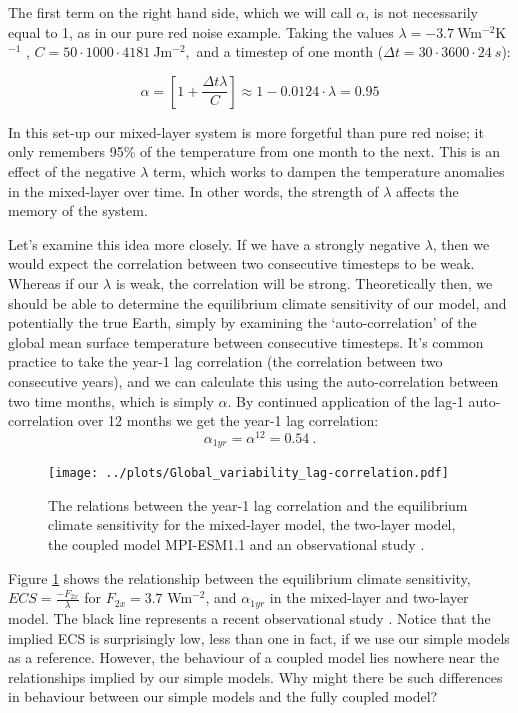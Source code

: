\documentclass[12pt]{book}
\begin{document}
The first term on the right hand side, which we will call $\alpha$, is not necessarily equal to 1, as in our pure red noise example. Taking the values $\lambda = -3.7 \ $Wm$^{-2}$K$^{-1}$ , $C=50 \cdot 1000 \cdot4181 \ $Jm$^{-2},$  and a timestep of one month ($\Delta t=30 \cdot3600 \cdot24 \ s$):

\begin{equation}
\alpha = \left[1 + \frac{\Delta t \lambda }{C}  \right] \approx 1 - 0.0124 \cdot \lambda = 0.95 
\end{equation}

In this set-up our mixed-layer system is more forgetful than pure red noise;  it only remembers 95\% of the temperature from one month to the next. This is an effect of the negative $\lambda$ term, which works to dampen the temperature anomalies in the mixed-layer over time. In other words, the strength of $\lambda$ affects the memory of the system.

Let's examine this idea more closely. If we have a strongly negative $\lambda$, then we would expect the correlation between two consecutive timesteps to be weak. Whereas if our $\lambda$ is weak, the correlation will be strong. Theoretically then, we should be able to  determine the equilibrium climate sensitivity of our model, and potentially the true Earth, simply by examining the `auto-correlation' of the global mean surface temperature between consecutive timesteps. It's common practice to take the year-1 lag correlation (the correlation between two consecutive years), and we can calculate this using the auto-correlation between two time months, which is simply $\alpha$. By continued application of the lag-1 auto-correlation over 12 months we get the year-1 lag correlation: $$\alpha_{1yr} = \alpha^{12} = 0.54 \ .$$
\begin{figure}
	\begin{center}
		\texttt{[image: ../plots/Global\_variability\_lag-correlation.pdf]}
	\end{center}
	\caption{ The relations between the year-1 lag correlation and the equilibrium climate sensitivity for the mixed-layer model, the two-layer model, the coupled model MPI-ESM1.1 and an observational study \cite{Cox2018}. } 
	\label{fig:lag_correlation}
\end{figure}
Figure \ref{fig:lag_correlation} shows the relationship between the equilibrium climate sensitivity,  $ECS = \frac{-F_{2x}}{\lambda} $ for $F_{2x}=3.7 $ Wm$^{-2}$, and $\alpha_{1yr}$ in the mixed-layer and two-layer model. The black line represents a recent observational study \cite{Cox2018}. Notice that the implied ECS is surprisingly low, less than one in fact, if we use our simple models as a reference. However, the behaviour of a coupled model lies nowhere near the relationships implied by our simple models. Why might there be such differences in behaviour between our simple models and the fully coupled model? 
\end{document}
